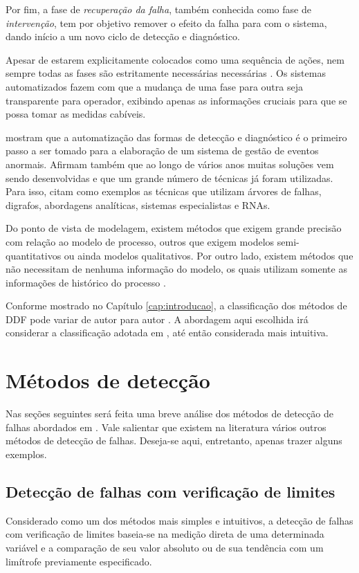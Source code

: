 Por fim, a fase de {\it recuperação da falha}, também conhecida como fase de
{\it intervenção}, tem por objetivo remover o efeito da falha para com o
sistema, dando início a um novo ciclo de detecção e diagnóstico.

Apesar de estarem explicitamente colocados como uma sequência de ações, nem
sempre todas as fases são estritamente necessárias necessárias
\cite{chiang:2001}. Os sistemas automatizados fazem com que a mudança de uma
fase para outra seja transparente para operador, exibindo apenas as informações
cruciais para que se possa tomar as medidas cabíveis.

 mostram que a automatização das formas de detecção
e diagnóstico é o primeiro passo a ser tomado para a elaboração de um sistema de
gestão de eventos anormais. Afirmam também que ao longo de vários anos muitas
soluções vem sendo desenvolvidas e que um grande número de técnicas já foram
utilizadas. Para isso, citam como exemplos as técnicas que utilizam árvores de
falhas, digrafos, abordagens analíticas, sistemas especialistas e RNAs.

\fussy
Do ponto de vista de modelagem, existem métodos que exigem grande precisão com
relação ao modelo de processo, outros que exigem modelos semi-quantitativos ou
ainda modelos qualitativos. Por outro lado, existem métodos que não necessitam
de nenhuma informação do modelo, os quais utilizam somente as informações de
histórico do processo \cite{venkatasu:2003a}.
\sloppy

Conforme mostrado no Capítulo \ref{cap:introducao}, a classificação dos métodos
de DDF pode variar de autor para autor
\cite{venkatasu:2003a,angeli:2004,zhang:2008,isermann:2006}. A abordagem aqui
escolhida irá considerar a classificação adotada em ,
até então considerada mais intuitiva.

\section{Métodos de detecção}
Nas seções seguintes será feita uma breve análise dos métodos de detecção de
falhas abordados em . Vale salientar que existem na
literatura vários outros métodos de detecção de falhas. Deseja-se aqui,
entretanto, apenas trazer alguns exemplos.

\subsection{Detecção de falhas com verificação de limites}
Considerado como um dos métodos mais simples e intuitivos, a detecção de falhas
com verificação de limites baseia-se na medição direta de uma determinada
variável e a comparação de seu valor absoluto ou de sua tendência com um
limítrofe previamente especificado.

